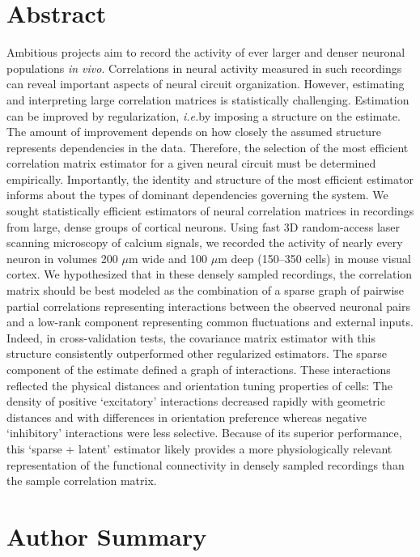 \documentclass[10pt]{article}
\newcommand{\sq}[1]{\lq#1\rq}
\newcommand{\ie}{\emph{i.e.}\;}
\begin{document}
\section*{Abstract}
Ambitious projects aim to record the activity of ever larger and denser neuronal populations \emph{in vivo}.  Correlations in neural activity measured in such recordings can reveal important aspects of  neural circuit organization.  However, estimating and interpreting large correlation matrices is statistically challenging.  Estimation can be improved by regularization, \ie by imposing a structure on the estimate.  The amount of improvement depends on how closely the assumed structure represents dependencies in the data. Therefore, the selection of the most efficient correlation matrix estimator for a given neural circuit must be determined empirically.  Importantly, the identity and structure of the most efficient estimator informs about the types of dominant dependencies governing the system.
We sought statistically efficient estimators of neural correlation matrices in recordings from large, dense groups of cortical neurons.  Using fast 3D random-access laser scanning microscopy of calcium signals, we recorded the activity of nearly every neuron in volumes 200 $\mu$m wide and 100 $\mu$m deep (150--350 cells) in mouse visual cortex.  We hypothesized that in these densely sampled recordings, the correlation matrix should be best modeled as the combination of a sparse graph of pairwise partial correlations representing interactions between the observed neuronal pairs and a low-rank component representing common fluctuations and external inputs.  Indeed, in cross-validation tests, the covariance matrix estimator with this structure consistently outperformed other regularized estimators. The sparse component of the estimate defined a graph of interactions. These interactions reflected the physical distances and orientation tuning properties of cells: The density of positive \sq{excitatory} interactions decreased rapidly with geometric distances and with differences in orientation preference whereas negative \sq{inhibitory} interactions were less selective.  Because of its superior performance, this \sq{sparse + latent} estimator likely provides a more physiologically relevant representation of the functional connectivity in densely sampled recordings than the sample correlation matrix.

\section*{Author Summary}
\end{document}
